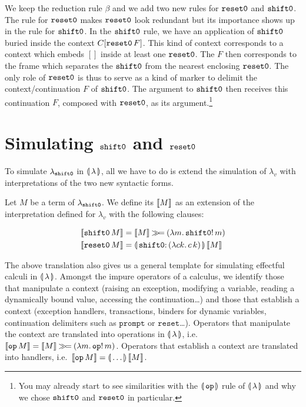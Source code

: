 We keep the reduction rule $\beta$ and we add two new rules for $\mathtt{reset0}$
and $\mathtt{shift0}$. The rule for $\mathtt{reset0}$ makes $\mathtt{reset0}$ look redundant but
its importance shows up in the rule for $\mathtt{shift0}$. In the $\mathtt{shift0}$ rule,
we have an application of $\mathtt{shift0}$ buried inside the context
$C[\mathtt{reset0}\,F]$. This kind of context corresponds to a context which
embeds $[]$ inside at least one $\mathtt{reset0}$. The $F$ then corresponds to the
frame which separates the $\mathtt{shift0}$ from the nearest enclosing
$\mathtt{reset0}$. The only role of $\mathtt{reset0}$ is thus to serve as a kind of marker
to delimit the context/continuation $F$ of $\mathtt{shift0}$. The argument to
$\mathtt{shift0}$ then receives this continuation $F$, composed with $\mathtt{reset0}$, as
its argument.\footnote{You may already start to see similarities with the
  $\llparenthesis \, \mathtt{op} \, \rrparenthesis$ rule of $\llparenthesis \, \lambda \, \rrparenthesis$ and why we chose $\mathtt{shift0}$
  and $\mathtt{reset0}$ in particular.}

\section{Simulating $\mathtt{shift0}$ and $\mathtt{reset0}$}
\label{sec:simulating-shift0}

To simulate $\lambda_{\mathtt{shift0}}$ in $\llparenthesis \, \lambda \, \rrparenthesis$, all we have to do is
extend the simulation of $\lambda_v$ with interpretations of the two new
syntactic forms.

\begin{definition}
  Let $M$ be a term of $\lambda_{\mathtt{shift0}}$. We define its
   $\llbracket M \rrbracket$ as an extension of the interpretation
  defined for $\lambda_v$ with the following clauses:

\begin{align*}
  \sem{\ap{\shifto}{M}} &= \sem{M} \hsbind (\lam{m}{\ap{\op{shift0}!}{m}}) \\
  \sem{\ap{\reseto}{M}} &= \ap{\resetobanana}{\sem{M}}
\end{align*}
\end{definition}

The above translation also gives us a general template for simulating
effectful calculi in $\llparenthesis \, \lambda \, \rrparenthesis$. Amongst the impure operators of a
calculus, we identify those that manipulate a context (raising an
exception, modifying a variable, reading a dynamically bound value,
accessing the continuation\ldots) and those that establish a context
(exception handlers, transactions, binders for dynamic variables,
continuation delimiters such as $\texttt{prompt}$ or
$\texttt{reset}$\ldots). Operators that manipulate the context are
translated into operations in $\llparenthesis \, \lambda \, \rrparenthesis$,
i.e.\ $\llbracket \texttt{op}\,M \rrbracket = \llbracket M \rrbracket \mathbin{\gg\!=}
(\lambda m.\, \mathtt{op}!\,m)$. Operators that establish a context are
translated into handlers, i.e.\ $\llbracket \texttt{op}\,M \rrbracket =
\llparenthesis \, \ldots \, \rrparenthesis\,\llbracket M \rrbracket$.

